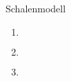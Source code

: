 \documentclass{alex_hü}
\begin{document}
\begin{mybox}{Schalenmodell}
	\centering \(  \)
	\tcblower
	\begin{enumerate}
		\item \(  \)
	\tcbline
		\item \(  \)
	\tcbline
		\item \(  \)
	\end{enumerate}
\end{mybox}
\end{document}
